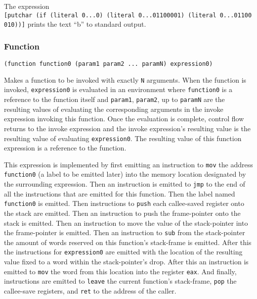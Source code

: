 \documentclass[]{article}
\begin{document}
The expression
\texttt{{[}putchar\ (if\ (literal\ 0...0)\ (literal\ 0...01100001)\ (literal\ 0...01100010)){]}}
prints the text ``b'' to standard output.

\hypertarget{function}{\subsubsection{Function}\label{function}}

\begin{verbatim}
(function function0 (param1 param2 ... paramN) expression0)
\end{verbatim}

Makes a function to be invoked with exactly \texttt{N} arguments. When
the function is invoked, \texttt{expression0} is evaluated in an
environment where \texttt{function0} is a reference to the function
itself and \texttt{param1}, \texttt{param2}, up to \texttt{paramN} are
the resulting values of evaluating the corresponding arguments in the
invoke expression invoking this function. Once the evaluation is
complete, control flow returns to the invoke expression and the invoke
expression's resulting value is the resulting value of evaluating
\texttt{expression0}. The resulting value of this function expression is
a reference to the function.

This expression is implemented by first emitting an instruction to
\texttt{mov} the address \texttt{function0} (a label to be emitted
later) into the memory location designated by the surrounding
expression. Then an instruction is emitted to \texttt{jmp} to the end of
all the instructions that are emitted for this function. Then the label
named \texttt{function0} is emitted. Then instructions to \texttt{push}
each callee-saved register onto the stack are emitted. Then an
instruction to push the frame-pointer onto the stack is emitted. Then an
instruction to move the value of the stack-pointer into the
frame-pointer is emitted. Then an instruction to \texttt{sub} from the
stack-pointer the amount of words reserved on this function's
stack-frame is emitted. After this the instructions for
\texttt{expression0} are emitted with the location of the resulting
value fixed to a word within the stack-pointer's drop. After this an
instruction is emitted to \texttt{mov} the word from this location into
the register \texttt{eax}. And finally, instructions are emitted to
\texttt{leave} the current function's stack-frame, \texttt{pop} the
callee-save registers, and \texttt{ret} to the address of the caller.
\end{document}
